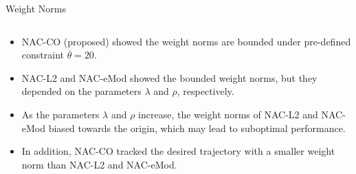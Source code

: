 \documentclass[8pt, aspectratio=169]{beamer}
\begin{document}
\begin{frame}{\insertsubsectionhead}{Weight Norms}
\begin{columns}
  \end{columns}

  \begin{itemize}
    \item NAC-CO (proposed) showed the weight norms are bounded under pre-defined constraint $\overline{\theta}=20$.
    \item NAC-L2 and NAC-eMod showed the bounded weight norms, but they depended on the parameters $\lambda$ and $\rho$, respectively.
    \item As the parameters $\lambda$ and $\rho$ increase, the weight norms of NAC-L2 and NAC-eMod biased towards the origin, which may lead to suboptimal performance.
    \item In addition, NAC-CO tracked the desired trajectory with a smaller weight norm than NAC-L2 and NAC-eMod.
  \end{itemize}

\end{frame}
\end{document}
